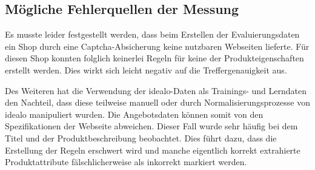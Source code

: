 \subsection{Mögliche Fehlerquellen der Messung}
\label{subsec:fehlerquellen}

Es musste leider festgestellt werden, dass beim Erstellen der Evaluierungsdaten ein Shop durch eine
Captcha-Absicherung keine nutzbaren Webseiten lieferte.
Für diesen Shop konnten folglich keinerlei Regeln für keine der Produkteigenschaften erstellt werden.
Dies wirkt sich leicht negativ auf die Treffergenauigkeit aus.

Des Weiteren hat die Verwendung der idealo-Daten als Trainings- und Lerndaten den Nachteil, dass diese teilweise
manuell oder durch Normalisierungsprozesse von idealo manipuliert wurden.
Die Angebotsdaten können somit von den Spezifikationen der Webseite abweichen.
Dieser Fall wurde sehr häufig bei dem Titel und der Produktbeschreibung beobachtet.
Dies führt dazu, dass die Erstellung der Regeln erschwert wird und manche eigentlich korrekt extrahierte
Produktattribute fälschlicherweise als inkorrekt markiert werden.